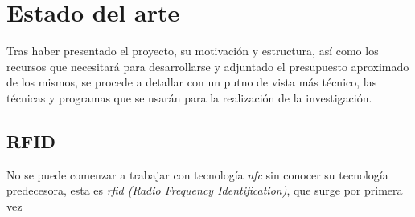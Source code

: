 \chapter{Estado del arte}

Tras haber presentado el proyecto, su motivación y estructura, así como los recursos que necesitará para desarrollarse 
y adjuntado el presupuesto aproximado de los mismos, se procede a detallar con un putno de vista más técnico, las
técnicas y programas que se usarán para la realización de la investigación. \newline

\section{RFID}

No se puede comenzar a trabajar con tecnología \textit{\acrshort{nfc}} sin conocer su tecnología predecesora, esta es 
\textit{\acrshort{rfid} (Radio Frequency Identification)}, que surge por primera vez \cite{RFIDComputerAndSecurity}
